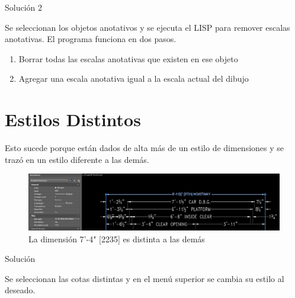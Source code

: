 \documentclass[12pt,letterpaper,final]{report}
\begin{document}
{\LARGE Solución 2}

Se seleccionan los objetos anotativos y se ejecuta el LISP para remover escalas anotativas.
El programa funciona en dos pasos.

\begin{enumerate}
	\item Borrar todas las escalas anotativas que existen en ese objeto
	\item Agregar una escala anotativa igual a la escala actual del dibujo
\end{enumerate}

\section{Estilos Distintos}

Esto sucede porque están dados de alta más de un estilo de dimensiones y se trazó en un estilo diferente a las demás.

\begin{figure}[H]
	\centering
	\includegraphics[width=0.95\linewidth, height=0.5\textheight,keepaspectratio]{Imagenes/apendice_anotative_08}
	\caption{La dimensión 7'-4" [2235] es distinta a las demás}
	\label{fig:apendiceanotative08}
\end{figure}

{\LARGE Solución}

Se seleccionan las cotas distintas y en el menú superior se cambia su estilo al deseado.
\end{document}
